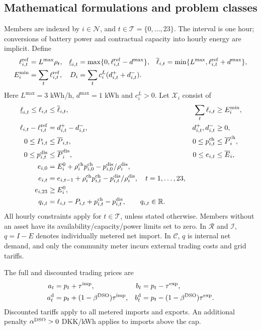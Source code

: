 \subsection{Mathematical formulations and problem classes}
Members are indexed by $i\in\mathcal N$, and $t\in\mathcal T=\{0,\ldots,23\}$.
The interval is one hour; conversions of battery power and contractual
capacity into hourly energy are implicit. Define
\begin{align}
 \ell^{\rm ref}_{i,t}&=L^{\max}\rho_t,&
 \underline\ell_{i,t}&=\max\{0,\ell^{\rm ref}_{i,t}-d^{\max}\},&
 \overline\ell_{i,t}&=\min\{L^{\max},\ell^{\rm ref}_{i,t}+d^{\max}\},\\
 E_i^{\min}&=\sum_t\ell^{\rm ref}_{i,t},&
 D_i&=\sum_t c_i^L(d^+_{i,t}+d^-_{i,t}).
\end{align}
Here $L^{\max}=3$ kWh/h, $d^{\max}=1$ kWh and $c_i^L>0$.
Let $\mathcal X_i$ consist of
\begin{align}
 \underline\ell_{i,t}\le\ell_{i,t}&\le\overline\ell_{i,t},&
 \sum_t\ell_{i,t}&\ge E_i^{\min},\\
 \ell_{i,t}-\ell^{\rm ref}_{i,t}&=d^+_{i,t}-d^-_{i,t},&
 d^+_{i,t},d^-_{i,t}&\ge0,\\
 0\le P_{i,t}&\le\overline P_{i,t},&
 0\le p^{\rm ch}_{i,t}&\le\overline P_i^{\rm ch},\\
 0\le p^{\rm dis}_{i,t}&\le\overline P_i^{\rm dis},&
 0\le e_{i,t}&\le\overline E_i,\\
 e_{i,0}&=E_i^0+\rho_i^{\rm ch}p^{\rm ch}_{i,0}
                         -p^{\rm dis}_{i,0}/\rho_i^{\rm dis},\\
 e_{i,t}&=e_{i,t-1}+\rho_i^{\rm ch}p^{\rm ch}_{i,t}
                         -p^{\rm dis}_{i,t}/\rho_i^{\rm dis},\quad t=1,\ldots,23,\\
 e_{i,23}&\ge E_i^0,\\
 q_{i,t}&=\ell_{i,t}-P_{i,t}+p^{\rm ch}_{i,t}-p^{\rm dis}_{i,t},
 \qquad q_{i,t}\in\mathbb R.
\end{align}
All hourly constraints apply for $t\in\mathcal T$, unless stated otherwise.
Members without an asset have its availability/capacity/power limits set to zero.
In $\mathcal R$ and $\mathcal I$, $q=I-E$ denotes individually metered net
import. In $\mathcal C$, $q$ is internal net demand, and only the community
meter incurs external trading costs and grid tariffs.

The full and discounted trading prices are
\begin{align}
 a_t&=p_t+\tau^{\rm imp},& b_t&=p_t-\tau^{\rm exp},\\
 a_t^{\rm d}&=p_t+(1-\beta^{\rm DSO})\tau^{\rm imp},&
 b_t^{\rm d}&=p_t-(1-\beta^{\rm DSO})\tau^{\rm exp}.
\end{align}
Discounted tariffs apply to all metered imports and exports. An additional
penalty $\alpha^{\rm DSO}>0$ DKK/kWh applies to imports above the cap.

